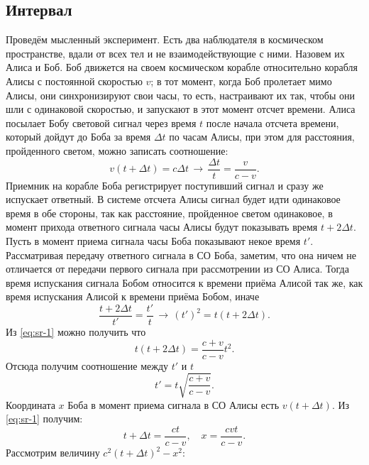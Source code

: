 \subsection{Интервал}
Проведём мысленный эксперимент. Есть два наблюдателя в космическом пространстве, вдали от всех тел и не взаимодействующие с ними. Назовем их Алиса и Боб. Боб движется на своем космическом корабле относительно корабля Алисы с постоянной скоростью $v$; в тот момент, когда Боб пролетает мимо Алисы, они синхронизируют свои часы, то есть, настраивают их так, чтобы они шли с одинаковой скоростью, и запускают в этот момент отсчет времени. Алиса посылает Бобу световой сигнал через время $t$ после начала отсчета времени, который дойдут до Боба за время $\Delta t$ по часам Алисы, при этом для расстояния, пройденного светом, можно записать соотношение: 
 \begin{equation}
 	v(t + \Delta t) = c \Delta t \,\rightarrow\, \frac{\Delta t}{t} = \frac{v}{c-v}.
 \label{eq:sr-1}
 \end{equation}
 Приемник на корабле Боба регистрирует поступивший сигнал и сразу же испускает ответный. В системе отсчета Алисы сигнал будет идти одинаковое время в обе стороны, так как расстояние, пройденное светом одинаковое, в момент прихода ответного сигнала часы Алисы будут показывать время $t+2\Delta t$. Пусть в момент приема сигнала часы Боба показывают некое время $t'$. Рассматривая передачу ответного сигнала в СО Боба, заметим, что она ничем не отличается от передачи первого сигнала при рассмотрении из СО Алиса. Тогда время испускания сигнала Бобом относится к времени приёма Алисой так же, как время испускания Алисой к времени приёма Бобом, иначе
 \begin{equation}
 	\frac{t+2\Delta t}{t'}=\frac{t'}{t} \,\rightarrow\, (t')^2 = t(t+2\Delta t).
 	 \label{eq:sr-2}
 \end{equation}
 Из \eqref{eq:sr-1} можно получить что
\begin{equation*}
	t(t+2\Delta t)=\frac{c+v}{c-v}t^2.
\end{equation*}
Отсюда получим соотношение между $t'$ и $t$
\begin{equation*}
	t' = t \sqrt{\frac{c+v}{c-v}}.
\end{equation*}
Координата $x$ Боба в момент приема сигнала в СО Алисы есть $v(t+\Delta t)$. Из \eqref{eq:sr-1} получим:
\begin{equation*}
	t + \Delta t = \frac{ct}{c-v}, \quad x = \frac{cvt}{c-v}.
\end{equation*}
Рассмотрим величину $c^2(t+\Delta t)^2-x^2$:
